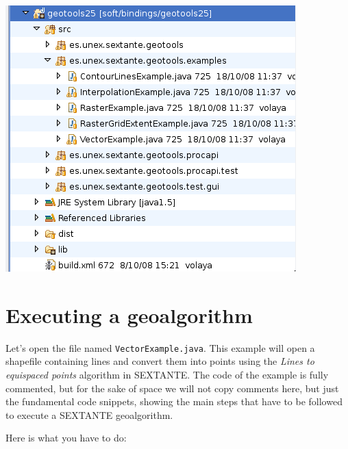 \begin{center}
 \includegraphics[width=.6\textwidth]{gt_examples.png} 
\end{center}

\section{Executing a geoalgorithm}

Let's open the file named \texttt{VectorExample.java}. This example will open a shapefile containing lines and convert them into points using the \emph{Lines to equispaced points} algorithm in SEXTANTE. The code of the example is fully commented, but for the sake of space we will not copy comments here, but just the fundamental code snippets, showing the main steps that have to be followed to execute a SEXTANTE geoalgorithm.

Here is what you have to do:

